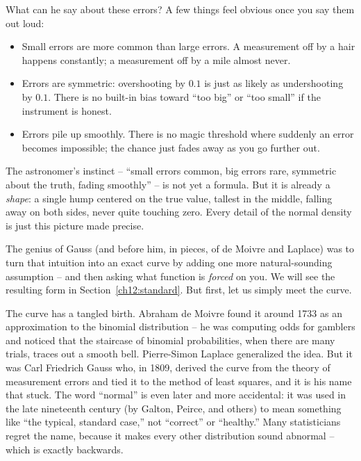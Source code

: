 What can he say about these errors? A few things feel obvious once you say them
out loud:

\begin{itemize}
  \item Small errors are more common than large errors. A measurement off by a
  hair happens constantly; a measurement off by a mile almost never.
  \item Errors are symmetric: overshooting by $0.1$ is just as likely as
  undershooting by $0.1$. There is no built-in bias toward ``too big'' or ``too
  small'' if the instrument is honest.
  \item Errors pile up smoothly. There is no magic threshold where suddenly an
  error becomes impossible; the chance just fades away as you go further out.
\end{itemize}

\begin{intuitionbox}
The astronomer's instinct -- ``small errors common, big errors rare, symmetric
about the truth, fading smoothly'' -- is not yet a formula. But it is already a
\emph{shape}: a single hump centered on the true value, tallest in the middle,
falling away on both sides, never quite touching zero. Every detail of the normal
density is just this picture made precise.
\end{intuitionbox}

The genius of Gauss (and before him, in pieces, of de Moivre and Laplace) was to
turn that intuition into an exact curve by adding one more natural-sounding
assumption -- and then asking what function is \emph{forced} on you. We will see
the resulting form in Section~\ref{ch12:standard}. But first, let us simply meet
the curve.

\begin{historybox}
The curve has a tangled birth. Abraham de Moivre found it around 1733 as an
approximation to the binomial distribution -- he was computing odds for
gamblers and noticed that the staircase of binomial probabilities, when there
are many trials, traces out a smooth bell. Pierre-Simon Laplace generalized the
idea. But it was Carl Friedrich Gauss who, in 1809, derived the curve from the
theory of measurement errors and tied it to the method of least squares, and it
is his name that stuck. The word ``normal'' is even later and more accidental: it
was used in the late nineteenth century (by Galton, Peirce, and others) to mean
something like ``the typical, standard case,'' not ``correct'' or ``healthy.''
Many statisticians regret the name, because it makes every other distribution
sound abnormal -- which is exactly backwards.
\end{historybox}

